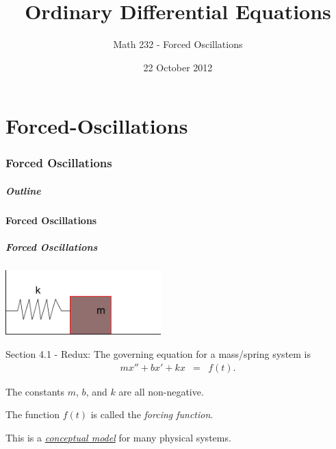 \part{Forced-Oscillations}
\section{Forced Oscillations}

\title{Ordinary Differential Equations}
\subtitle{Math 232 - Forced Oscillations}
\date{22 October 2012}

\begin{frame}
  \titlepage
\end{frame}

\begin{frame}
  \frametitle{Outline}
\end{frame}


\subsection{Forced Oscillations}


\begin{frame}
  \frametitle{Forced Oscillations}

  \includegraphics[width=6cm]{img/springMassStatic}

  Section 4.1 - Redux: The governing equation for a mass/spring system
  is
  \begin{eqnarray*}
    mx'' + bx'+kx & = & f(t).
  \end{eqnarray*}

  The constants $m$, $b$, and $k$ are all non-negative.

  The function $f(t)$ is called the \textit{forcing function}.

  This is a \underline{\textit{conceptual model}} for many physical systems.

\end{frame}


